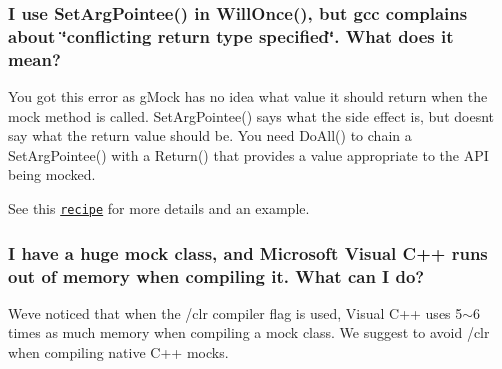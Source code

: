 \subsubsection*{I use Set\+Arg\+Pointee() in Will\+Once(), but gcc complains about \char`\"{}conflicting return type specified\char`\"{}. What does it mean?}

You got this error as g\+Mock has no idea what value it should return when the mock method is called. {\ttfamily Set\+Arg\+Pointee()} says what the side effect is, but doesn\textquotesingle{}t say what the return value should be. You need {\ttfamily Do\+All()} to chain a {\ttfamily Set\+Arg\+Pointee()} with a {\ttfamily Return()} that provides a value appropriate to the A\+PI being mocked.

See this \href{gmock_cook_book.md#mocking-side-effects}{\tt recipe} for more details and an example.

\subsubsection*{I have a huge mock class, and Microsoft Visual C++ runs out of memory when compiling it. What can I do?}

We\textquotesingle{}ve noticed that when the {\ttfamily /clr} compiler flag is used, Visual C++ uses 5$\sim$6 times as much memory when compiling a mock class. We suggest to avoid {\ttfamily /clr} when compiling native C++ mocks. 